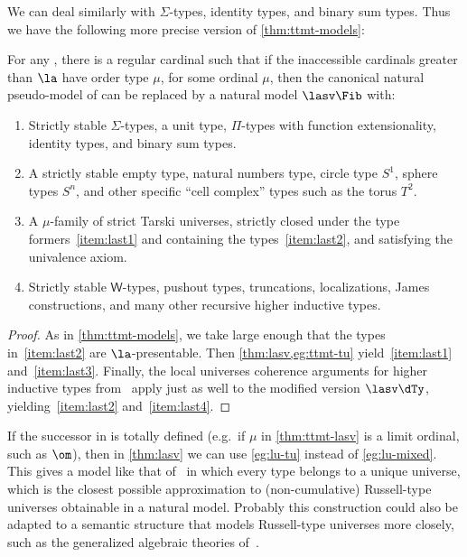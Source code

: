 We can deal similarly with $\Sigma$-types, identity types, and binary sum types.
Thus we have the following more precise version of \cref{thm:ttmt-models}:

\begin{thm}\label{thm:ttmt-lasv}
  For any \ttmt \E, there is a regular cardinal \la such that if the inaccessible cardinals greater than $\la$ have order type $\mu$, for some ordinal $\mu$, then the canonical natural pseudo-model of \E can be replaced by a natural model $\lasv\Fib$ with:
  \begin{enumerate}
  \item Strictly stable $\Sigma$-types, a unit type, $\Pi$-types with function extensionality, identity types, and binary sum types.\label{item:last1}
  \item A strictly stable empty type, natural numbers type, circle type $S^1$, sphere types $S^n$, and other specific ``cell complex'' types such as the torus $T^2$.\label{item:last2}
  \item A $\mu$-family of strict Tarski universes, strictly closed under the type formers~\ref{item:last1} and containing the types~\ref{item:last2}, and satisfying the univalence axiom.\label{item:last3}
  \item Strictly stable $\mathsf{W}$-types, pushout types, truncations, localizations, James constructions, and many other recursive higher inductive types.\label{item:last4}
  \end{enumerate}
\end{thm}
\begin{proof}
  As in \cref{thm:ttmt-models}, we take \la large enough that the types in~\ref{item:last2} are $\la$-presentable.
  Then \cref{thm:lasv,eg:ttmt-tu} yield~\ref{item:last1} and~\ref{item:last3}.
  Finally, the local universes coherence arguments for higher inductive types from~\cite{ls:hits} apply just as well to the modified version $\lasv\dTy$, yielding~\ref{item:last2} and~\ref{item:last4}.
\end{proof}

\begin{rmk}\label{rmk:russell}
  If the successor in \cL is totally defined (e.g.\ if $\mu$ in \cref{thm:ttmt-lasv} is a limit ordinal, such as $\om$), then in \cref{thm:lasv} we can use \cref{eg:lu-tu} instead of \cref{eg:lu-mixed}.
  This gives a model like that of~\cite{coquand:pshf-model} in which every type belongs to a unique universe, which is the closest possible approximation to (non-cumulative) Russell-type universes obtainable in a natural model.
  Probably this construction could also be adapted to a semantic structure that models Russell-type universes more closely, such as the generalized algebraic theories of~\cite{coquand:cannorm-dtt,sterling:att-universes,chs:hocan-cubical}.
\end{rmk}

